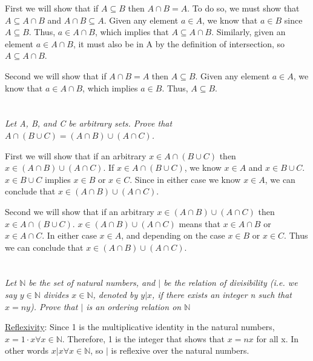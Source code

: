 \documentclass[]{article}
\newcommand{\naturals}{\mathbb{N}}
\begin{document}
		First we will show that if $A \subseteq B$ then $A \cap B = A$. To do so, we must show that $A \subseteq A \cap B$ and $A \cap B \subseteq A$. Given any element $a \in A$, we know that $a \in B$ since $A \subseteq B$. Thus, $a \in A \cap B$, which implies that $A \subseteq A \cap B$. Similarly, given an element $a \in A \cap B$, it must also be in A by the definition of intersection, so $A \subseteq A \cap B$. 

		Second we will show that if $A \cap B = A$ then $A \subseteq B$. Given any element $a \in A$, we know that $a \in A \cap B$, which implies $a \in B$. Thus, $A \subseteq B$. 


	\section{}
		\textit{Let A, B, and C be arbitrary sets. Prove that $A \cap (B \cup C) = (A \cap B) \cup (A \cap C)$.}

		First we will show that if an arbitrary $x \in A \cap (B \cup C)$ then $x \in (A \cap B)\cup (A \cap C)$. If $x \in A \cap (B \cup C)$, we know $x \in A$ and $x \in B \cup C$. $x \in B \cup C$ implies $x \in B$ or $x \in C$. Since in either case we know $x \in A$, we can conclude that $x \in (A \cap B) \cup (A \cap C)$.

		Second we will show that if an arbitrary $x \in (A \cap B) \cup (A \cap C)$ then $x \in A \cap (B \cup C)$. $x \in (A \cap B) \cup (A \cap C)$ means that $x \in A \cap B$ or $x \in A \cap C$. In either case $x \in A$, and depending on the case $x \in B$ or $x \in C$. Thus we can conclude that $x \in (A \cap B) \cup (A \cap C)$.

	\section{}
		\textit{Let $\naturals$ be the set of natural numbers, and $|$ be the relation of divisibility (i.e. we say $y \in \naturals$ divides $x \in \naturals$, denoted by $y|x$, if there exists an integer n such that $x = ny$). Prove that $|$ is an ordering relation on $\naturals$}

			\underline{Reflexivity}: Since 1 is the multiplicative identity in the natural numbers, $x = 1 \cdot x \forall x \in \naturals$. Therefore, 1 is the integer that shows that $x = nx$ for all x. In other words $x | x \forall x \in \naturals$, so $|$ is reflexive over the natural numbers.
\end{document}
